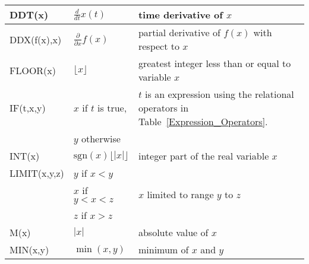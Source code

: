 {\begin{longtable}{>{\raggedright\small}m{1in}>{\raggedright\small}m{2in}>{\raggedright\let\\\tabularnewline\small}m{2in}}
    DDT(x)
    &  $\frac{d}{dt} x(t)$ & time derivative of $x$ \\ \hline

    DDX(f(x),x)
    &  $\frac{\partial}{\partial x} f(x)$ & partial derivative of $f(x)$ with respect to $x$ \\ \hline

    FLOOR(x) & $\lfloor x \rfloor$ & greatest integer less than or equal to variable $x$  \\ \hline

    IF(t,x,y)
    & $x$ if $t$ is true, & $t$ is an expression using the relational
    operators in Table~\ref{Expression_Operators}.\footnotemark[2]\\
    & $y$ otherwise       & \\ \hline
    
    INT(x) & $\mathrm{sgn}(x)\lfloor |x|\rfloor$ & integer part of the real 
    variable $x$  \\ \hline

    LIMIT(x,y,z)
    & $y$ if $x < y$ & \\
    & $x$ if $y < x < z$  & $x$ limited to range $y$ to $z$ \\
    & $z$ if $x > z$ & \\ \hline
    
    
    M(x) & $|x|$ & absolute value of $x$ \\ \hline

    MIN(x,y) & $\min(x,y)$ & minimum of $x$ and $y$  \\ \hline


\end{longtable}}
